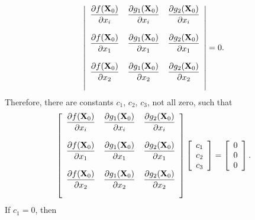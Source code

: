 \documentclass{article}
\newcommand{\dst}{\displaystyle}
\begin{document}
$$
\left|\begin{array}{ccccccc}
\dst{\frac{{\partial f({\bf X}_{0})}}{{\partial  x_{i}}}}&
\dst{\frac{{\partial g_{1}({\bf X}_{0})}}{{\partial  x_{i}}}}&
\dst{\frac{{\partial g_{2}({\bf X}_{0})}}{{\partial  x_{i}}}}\\\\
\dst{\frac{{\partial f({\bf X}_{0})}}{{\partial  x_{1}}}}&
\dst{\frac{{\partial g_{1}({\bf X}_{0})}}{{\partial  x_{1}}}}&
\dst{\frac{{\partial g_{2}({\bf X}_{0})}}{{\partial  x_{1}}}}\\\\
\dst{\frac{{\partial f({\bf X}_{0})}}{{\partial  x_{2}}}}&
\dst{\frac{{\partial g_{1}({\bf X}_{0})}}{{\partial  x_{2}}}}&
\dst{\frac{{\partial g_{2}({\bf X}_{0})}}{{\partial  x_{2}}}}\\\\
\end{array}\right|=0.
$$
Therefore, there are constants $c_{1}$, $c_{2}$, $c_{3}$, not all zero,
such
that
\begin{equation} \label{eq:24}
\left[\begin{array}{ccccccc}
\dst{\frac{{\partial f({\bf X}_{0})}}{{\partial  x_{i}}}}&
\dst{\frac{{\partial g_{1}({\bf X}_{0})}}{{\partial  x_{i}}}}&
\dst{\frac{{\partial g_{2}({\bf X}_{0})}}{{\partial  x_{i}}}}\\\\
\dst{\frac{{\partial f({\bf X}_{0})}}{{\partial  x_{1}}}}&
\dst{\frac{{\partial g_{1}({\bf X}_{0})}}{{\partial  x_{1}}}}&
\dst{\frac{{\partial g_{2}({\bf X}_{0})}}{{\partial  x_{1}}}}\\\\
\dst{\frac{{\partial f({\bf X}_{0})}}{{\partial  x_{2}}}}&
\dst{\frac{{\partial g_{1}({\bf X}_{0})}}{{\partial  x_{2}}}}&
\dst{\frac{{\partial g_{2}({\bf X}_{0})}}{{\partial  x_{2}}}}\\\\
\end{array}\right]
\left[\begin{array}{ccccccc}
c_{1}\\c_{2}\\c_{3}
\end{array}\right]=
\left[\begin{array}{ccccccc}
0\\0\\0
\end{array}\right].
\end{equation}
If $c_{1}=0$, then
\end{document}
